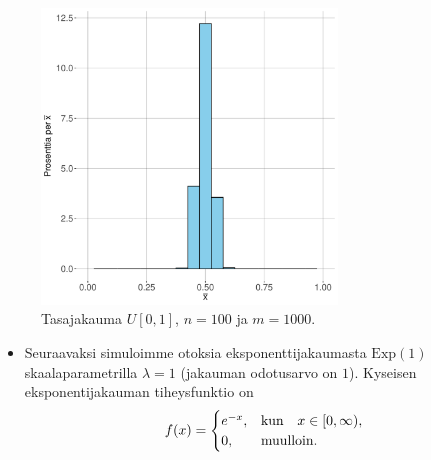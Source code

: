 \documentclass{beamer}
\begin{document}

\begin{frame}
  \begin{center}
    \begin{figure}
      \includegraphics[width=0.7\textwidth, height=0.7\textwidth]{unif-n-100.pdf}
      \caption{Tasajakauma $U[0,1]$, $n = 100$ ja $m = 1000$.}
    \end{figure}
  \end{center}
\end{frame}


\begin{frame}
  \begin{itemize}
    \item Seuraavaksi simuloimme otoksia eksponenttijakaumasta $\mathrm{Exp}(1)$
    skaalaparametrilla $\lambda = 1$ (jakauman odotusarvo on $1$). Kyseisen
    eksponentijakauman tiheysfunktio on
    \begin{equation*}
      f(x) =
      \begin{cases}
        e^{-x}, &\textnormal{kun}\quad x\in[0,\infty), \\
        0, &\textnormal{muulloin}. 
      \end{cases}
    \end{equation*}
  \end{itemize}
\end{frame}

\end{document}
